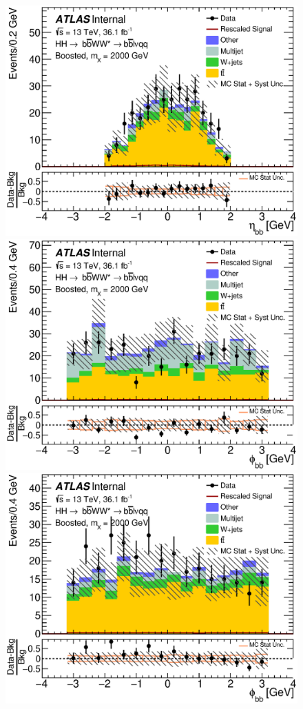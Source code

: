 \begin{figure}[h]
\begin{center}
\includegraphics[scale=0.33]{figures/kinplots/new/C_2tag_mbbcr_muon_presel_met50_HbbEta}\\
\includegraphics[scale=0.33]{figures/kinplots/new/C_2tag_mbbcr_elec_presel_met50_HbbPhi}
\includegraphics[scale=0.33]{figures/kinplots/new/C_2tag_mbbcr_muon_presel_met50_HbbPhi}

\end{center}
\end{figure}
